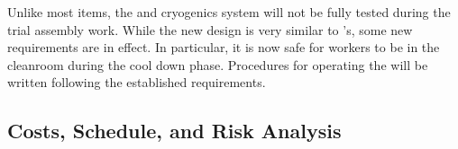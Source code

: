 Unlike most items, the \coldbox and cryogenics system will not be fully tested during the trial assembly work. While the new \coldbox design is very similar to 's, some new requirements are in effect. In particular, it is now safe for workers to be in the cleanroom during the cool down phase.  Procedures for operating the \coldbox will be written following the established requirements. 

  
\subsection{Costs, Schedule, and Risk Analysis}
\label{sec:fdsp-tc-infr-cost}


